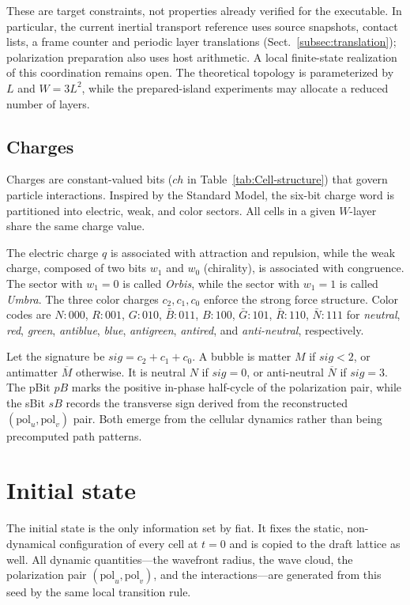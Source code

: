 \documentclass{ijuc}
\begin{document}
These are target constraints, not properties already verified for the executable. In particular, the current inertial transport reference uses source snapshots, contact lists, a frame counter and periodic layer translations (Sect.~\ref{subsec:translation}); polarization preparation also uses host arithmetic. A local finite-state realization of this coordination remains open. The theoretical topology is parameterized by $L$ and $W=3L^2$, while the prepared-island experiments may allocate a reduced number of layers.

\subsection{Charges}
\label{subsec:charges}

Charges are constant-valued bits ($ch$ in Table~\ref{tab:Cell-structure}) that govern particle interactions. Inspired by the Standard Model, the six-bit charge word is partitioned into electric, weak, and color sectors. All cells in a given $W$-layer share the same charge value.

The electric charge $q$ is associated with attraction and repulsion, while the weak charge, composed of two bits $w_1$ and $w_0$ (chirality), is associated with congruence. The sector with $w_1 = 0$ is called \emph{Orbis}, while the sector with $w_1 = 1$ is called \emph{Umbra}. The three color charges $c_2, c_1, c_0$ enforce the strong force structure. Color codes are $N:000$, $R:001$, $G:010$, $\bar{B}:011$, $B:100$, $\bar{G}:101$, $\bar{R}:110$, $\bar{N}:111$ for \emph{neutral}, \emph{red}, \emph{green}, \emph{antiblue}, \emph{blue}, \emph{antigreen}, \emph{antired}, and \emph{anti-neutral}, respectively.

Let the signature be $sig = c_2 + c_1 + c_0$. A bubble is matter $M$ if $sig < 2$, or antimatter $\overline{M}$ otherwise. It is neutral $N$ if $sig = 0$, or anti-neutral $\overline{N}$ if $sig = 3$. The pBit $pB$ marks the positive in-phase half-cycle of the polarization pair, while the sBit $sB$ records the transverse sign derived from the reconstructed $(\mathrm{pol}_u, \mathrm{pol}_v)$ pair. Both emerge from the cellular dynamics rather than being precomputed path patterns.

\section{Initial state}\label{initial-state}
The initial state is the only information set by fiat.  It fixes the static, non-dynamical configuration of every cell at $t=0$ and is copied to the draft lattice as well.  All dynamic quantities---the wavefront radius, the wave cloud, the polarization pair $(\mathrm{pol}_u,\mathrm{pol}_v)$, and the interactions---are generated from this seed by the same local transition rule.
\end{document}
